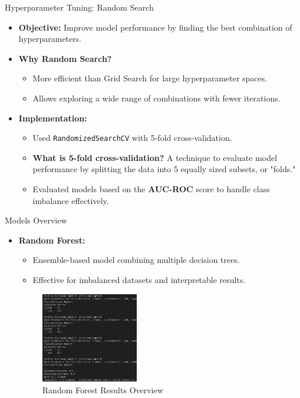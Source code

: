 \documentclass{beamer}
\begin{document}
\begin{frame}{Hyperparameter Tuning: Random Search}
    \begin{itemize}
        \item \textbf{Objective:} Improve model performance by finding the best combination of hyperparameters.
        \item \textbf{Why Random Search?}
        \begin{itemize}
            \item More efficient than Grid Search for large hyperparameter spaces.
            \item Allows exploring a wide range of combinations with fewer iterations.
        \end{itemize}
        \item \textbf{Implementation:}
        \begin{itemize}
            \item Used \texttt{RandomizedSearchCV} with 5-fold cross-validation.
            \item \textbf{What is 5-fold cross-validation?} A technique to evaluate model performance by splitting the data into 5 equally sized subsets, or "folds."
            \item Evaluated models based on the \textbf{AUC-ROC} score to handle class imbalance effectively.
        \end{itemize}
    \end{itemize}
\end{frame}

\begin{frame}{Models Overview}
    \begin{itemize}
        \item \textbf{Random Forest:}
        \begin{itemize}
            \item Ensemble-based model combining multiple decision trees.
            \item Effective for imbalanced datasets and interpretable results.
        \end{itemize}
    \begin{figure}
        \centering
        \includegraphics[width=0.4\textwidth]{images/rf.png} %
        \caption{Random Forest Results Overview}
    \end{figure}

    \end{itemize}
\end{frame}
\end{document}
